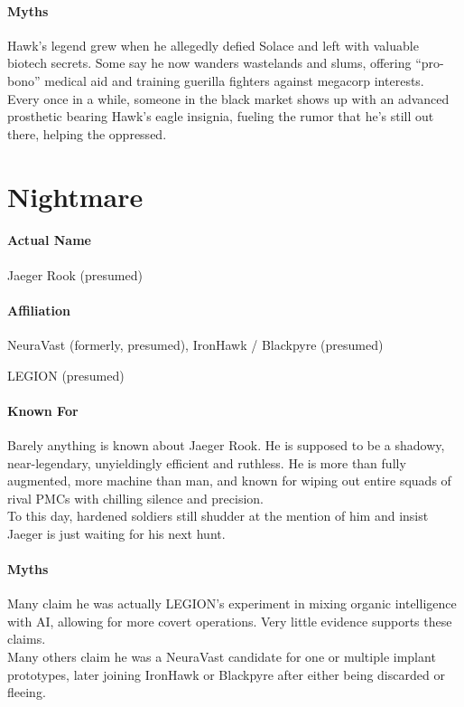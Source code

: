 \paragraph{Myths}
	Hawk’s legend grew when he allegedly defied Solace and left with valuable biotech secrets.
	Some say he now wanders wastelands and slums, offering “pro-bono” medical aid and training guerilla fighters against megacorp interests.
	\\%
	Every once in a while, someone in the black market shows up with an advanced prosthetic bearing Hawk’s eagle insignia, fueling the rumor that he’s still out there, helping the oppressed.

\section*{Nightmare}
\paragraph{Actual Name}
	Jaeger Rook (presumed)
\paragraph{Affiliation}
	\begin{sitemize}
		\item NeuraVast (formerly, presumed), IronHawk / Blackpyre (presumed)
		\item LEGION (presumed)
	\end{sitemize}
\paragraph{Known For}
	Barely anything is known about Jaeger Rook.
	He is supposed to be a shadowy, near-legendary, unyieldingly efficient and ruthless.
	He is more than fully augmented, more machine than man, and known for wiping out entire squads of rival PMCs with chilling silence and precision.
	\\%
	To this day, hardened soldiers still shudder at the mention of him and insist Jaeger is just waiting for his next hunt.
\paragraph{Myths}
	Many claim he was actually LEGION’s experiment in mixing organic intelligence with AI, allowing for more covert operations.
	Very little evidence supports these claims.
	\\%
	Many others claim he was a NeuraVast candidate for one or multiple implant prototypes, later joining IronHawk or Blackpyre after either being discarded or fleeing.

